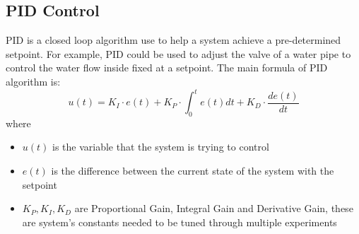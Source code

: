 
\subsection{PID Control}
PID is a closed loop algorithm use to help a system achieve a pre-determined setpoint.
For example, PID could be used to adjust the valve of a water pipe to control the water flow inside fixed at a setpoint.
The main formula of PID algorithm is:
$$u(t)=K_I\cdot e(t)+K_P\cdot\int_0^te(t)dt+K_D\cdot\frac{de(t)}{dt}$$
\vspace{-0.25cm}
where
\begin{itemize}
  \item $u(t)$ is the variable that the system is trying to control
  \item $e(t)$ is the difference between the current state of the system with the setpoint
  \item $K_P, K_I,K_D$ are Proportional Gain, Integral Gain and Derivative Gain, these are system's constants needed to be tuned through multiple experiments 
\end{itemize}

